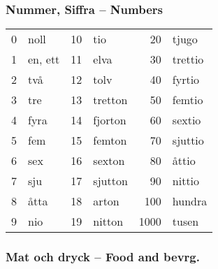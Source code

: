 \documentclass[14pt]{refcard} %
\begin{document}
\pagebreak

\subsubsection{Nummer, Siffra -- Numbers}
\vspace{-1ex}
\begin{tabular}{rl rl rl}
0 & noll    &  10 & tio              &   20 & tjugo            \\
1 & en, ett &  11 & elva             &   30 & trettio          \\
2 & två     &  12 & tolv             &   40 & fyrtio           \\
3 & tre     &  13 & tretton          &   50 & femtio           \\
4 & fyra    &  14 & fjorton          &   60 & sextio           \\
5 & fem     &  15 & femton           &   70 & sjuttio          \\
6 & sex     &  16 & sexton           &   80 & åttio            \\
7 & sju     &  17 & sjutton          &   90 & nittio           \\
8 & åtta    &  18 & arton            &  100 & hundra           \\
9 & nio     &  19 & nitton           & 1000 & tusen            \\
\end{tabular}


\pagebreak

\subsubsection{Mat och dryck -- Food and bevrg.}
\end{document}
